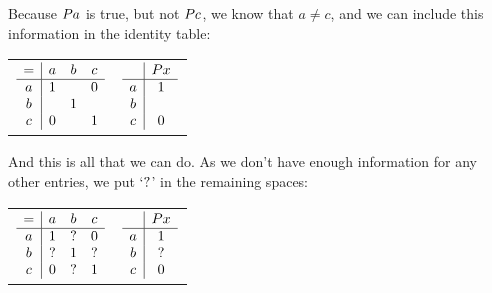 \documentclass[PHIL101-Textbook.tex]{subfiles}
\begin{document}
\noindent Because $\mathord{P}{a}$ is true, but not $\mathord{P}{c}$, we know that $a \neq c$, and we can include this information in the identity table: 

\begin{center}
  \begin{tabular}{ll}
  $\begin{array}{c|ccc}
	 = & a & b & c\\ \hline
	 a &1&   &0\\
	 b &   &1&\\
	 c &0&   &1
	 \end{array}$
&
	$\begin{array}{c|c}
	   & \mathord{P}{x} \\ \hline
	 a & 1\\
	 b & \\
	 c & 0
	\end{array}$
  \end{tabular}
\end{center}

%

\noindent And this is all that we can do. As we don't have enough information for any other entries, we put `$?$' in the remaining spaces: 

\begin{center}
  \begin{tabular}{ll}
  $\begin{array}{c|ccc}
	 = & a & b & c\\ \hline
	 a & 1 & ? & 0\\
	 b & ? & 1 & ?\\
	 c & 0 & ? & 1
   \end{array}$  
	 & 
   $\begin{array}{c|c}
	   & \mathord{P}{x} \\ \hline
	 a & 1\\
	 b & ?\\
	 c & 0
	 \end{array}$
  \end{tabular}
\end{center}
\end{document}
